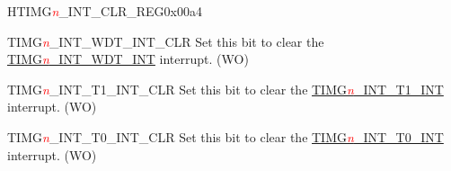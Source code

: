 \begin{register}{H}{TIMG\textcolor{red}{\it{n}}\_INT\_CLR\_REG}{0x00a4}\label{regdesc:TIMERSINTCLRREG}
%
%
%
%
\regnewline%
\begin{regdesc}\begin{reglist}
\item [TIMG\textcolor{red}{\it{n}}\_INT\_WDT\_INT\_CLR]Set this bit to clear the \hyperref[int:TIMERSINTWDTINT]{TIMG\textcolor{red}{\it{n}}\_INT\_WDT\_INT} interrupt. (WO)
\item [TIMG\textcolor{red}{\it{n}}\_INT\_T1\_INT\_CLR]Set this bit to clear the \hyperref[int:TIMERSINTT1INT]{TIMG\textcolor{red}{\it{n}}\_INT\_T1\_INT} interrupt. (WO)
\item [TIMG\textcolor{red}{\it{n}}\_INT\_T0\_INT\_CLR]Set this bit to clear the \hyperref[int:TIMERSINTT0INT]{TIMG\textcolor{red}{\it{n}}\_INT\_T0\_INT} interrupt. (WO)
\end{reglist}\end{regdesc}
\end{register}